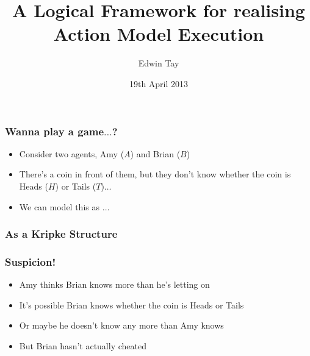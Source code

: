 \documentclass{beamer}
\begin{document}
\title{A Logical Framework for realising Action Model Execution}
\author{Edwin Tay}
\date{19th April 2013}

\begin{comment}
My honours presentation.
Need to discuss project and give a motivating idea.
In general:

given an epistemic goal we can find an action model we can construct an
action model

given an epistemic action model how can we realise it

do no maths, use pictures

don’t say “this is too complicated” - don’t
mention the “too complicated stuff”!
\end{comment}

\frame{\titlepage}

\begin{frame}
\frametitle{Wanna play a game$\ldots$?}
\begin{itemize}
  \item Consider two agents, Amy ($A$) and Brian ($B$)
  \item There's a coin in front of them, but they don't know whether the coin is
    Heads ($H$) or Tails ($T$)$\ldots$
  \item We can model this as $\ldots$
\end{itemize}
\end{frame}

\begin{frame}
\frametitle{As a Kripke Structure}
\begin{figure}
\end{figure}
\end{frame}

\begin{frame}
\frametitle{Suspicion!}
\begin{itemize}
  \item Amy thinks Brian knows more than he's letting on
  \item It's possible Brian knows whether the coin is Heads or Tails
  \item Or maybe he doesn't know any more than Amy knows
  \item But Brian hasn't actually cheated
\end{itemize}
\end{frame}
\end{document}
